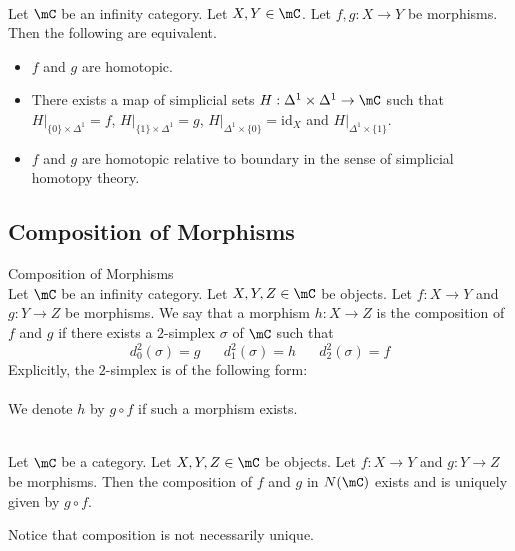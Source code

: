 \documentclass[a4paper]{article}
\begin{document}
\begin{prp}{}{}\\
Let $\mC$ be an infinity category. Let $X,Y\in\mC$. Let $f,g:X\to Y$ be morphisms. Then the following are equivalent. 
\begin{itemize}
\item $f$ and $g$ are homotopic. 
\item There exists a map of simplicial sets $H:\Delta^1\times\Delta^1\to\mC$ such that $H|_{\{0\}\times\Delta^1}=f$, $H|_{\{1\}\times\Delta^1}=g$, $H|_{\Delta^1\times\{0\}}=\text{id}_X$ and $H|_{\Delta^1\times\{1\}}$. 
\item $f$ and $g$ are homotopic relative to boundary in the sense of simplicial homotopy theory. 
\end{itemize}
\end{prp}

\subsection{Composition of Morphisms}
\begin{defn}{Composition of Morphisms}{}\\ Let $\mC$ be an infinity category. Let $X,Y,Z\in\mC$ be objects. Let $f:X\to Y$ and $g:Y\to Z$ be morphisms. We say that a morphism $h:X\to Z$ is the composition of $f$ and $g$ if there exists a $2$-simplex $\sigma$ of $\mC$ such that $$d_0^2(\sigma)=g\;\;\;\;\;\;d_1^2(\sigma)=h\;\;\;\;\;\;d_2^2(\sigma)=f$$ Explicitly, the $2$-simplex is of the following form: \\
\\
We denote $h$ by $g\circ f$ if such a morphism exists. 
\end{defn}

\begin{eg}{}{}\\
Let $\mC$ be a category. Let $X,Y,Z\in\mC$ be objects. Let $f:X\to Y$ and $g:Y\to Z$ be morphisms. Then the composition of $f$ and $g$ in $N(\mC)$ exists and is uniquely given by $g\circ f$. 
\end{eg}

Notice that composition is not necessarily unique. 
\end{document}
